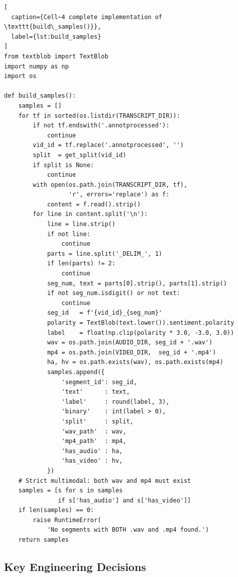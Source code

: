 \documentclass[12pt,a4paper]{article}
\theoremstyle{plain}
\theoremstyle{definition}
\begin{document}
\begin{lstlisting}[
  caption={Cell~4 complete implementation of \texttt{build\_samples()}},
  label={lst:build_samples}
]
from textblob import TextBlob
import numpy as np
import os

def build_samples():
    samples = []
    for tf in sorted(os.listdir(TRANSCRIPT_DIR)):
        if not tf.endswith('.annotprocessed'):
            continue
        vid_id = tf.replace('.annotprocessed', '')
        split  = get_split(vid_id)
        if split is None:
            continue
        with open(os.path.join(TRANSCRIPT_DIR, tf),
                  'r', errors='replace') as f:
            content = f.read().strip()
        for line in content.split('\n'):
            line = line.strip()
            if not line:
                continue
            parts = line.split('_DELIM_', 1)
            if len(parts) != 2:
                continue
            seg_num, text = parts[0].strip(), parts[1].strip()
            if not seg_num.isdigit() or not text:
                continue
            seg_id   = f'{vid_id}_{seg_num}'
            polarity = TextBlob(text.lower()).sentiment.polarity
            label    = float(np.clip(polarity * 3.0, -3.0, 3.0))
            wav = os.path.join(AUDIO_DIR, seg_id + '.wav')
            mp4 = os.path.join(VIDEO_DIR,  seg_id + '.mp4')
            ha, hv = os.path.exists(wav), os.path.exists(mp4)
            samples.append({
                'segment_id': seg_id,
                'text'      : text,
                'label'     : round(label, 3),
                'binary'    : int(label > 0),
                'split'     : split,
                'wav_path'  : wav,
                'mp4_path'  : mp4,
                'has_audio' : ha,
                'has_video' : hv,
            })
    # Strict multimodal: both wav and mp4 must exist
    samples = [s for s in samples
               if s['has_audio'] and s['has_video']]
    if len(samples) == 0:
        raise RuntimeError(
            'No segments with BOTH .wav and .mp4 found.')
    return samples
\end{lstlisting}

\subsection{Key Engineering Decisions}
\end{document}
